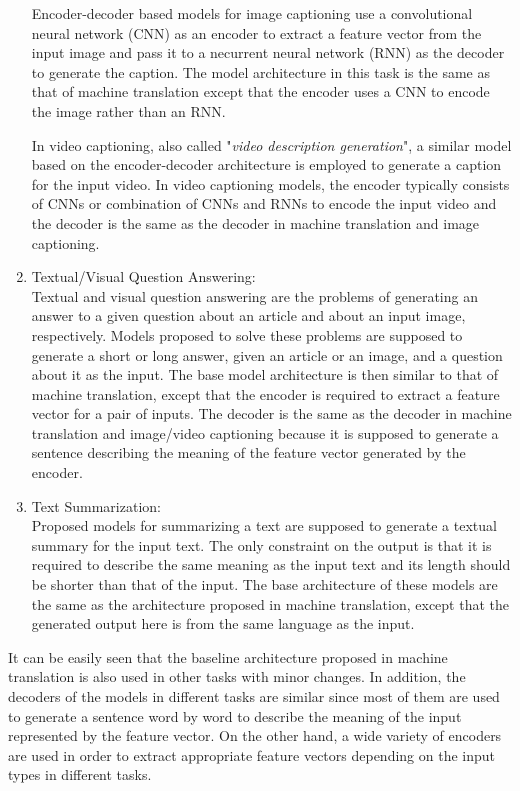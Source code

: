 \documentclass[preprint, 10pt]{elsarticle}
\begin{document}
\begin{enumerate}
		Encoder-decoder based models for image captioning use a convolutional neural network (CNN) as an encoder to extract a feature vector from the input image and pass it to a necurrent neural network (RNN) as the decoder to generate the caption. The model architecture in this task is the same as that of machine translation except that the encoder uses a CNN to encode the image rather than an RNN.
		
		In video captioning, also called "\textit{video description generation}", a similar model based on the encoder-decoder architecture is employed to generate a caption for the input video. In video captioning models, the encoder typically consists of CNNs or combination of CNNs and RNNs to encode the input video and the decoder is the same as the decoder in machine translation and image captioning. 
		
		
		\item Textual/Visual Question Answering:\\
		Textual and visual question answering are the problems of generating an answer to a given question about an article and about an input image, respectively. Models proposed to solve these problems are supposed to generate a short or long answer, given an article or an image, and a question about it as the input. The base model architecture is then similar to that of machine translation, except that the encoder is required to extract a feature vector for a pair of inputs. The decoder is the same as the decoder in machine translation and image/video captioning because it is supposed to generate a sentence describing the meaning of the feature vector generated by the encoder.
		
		\item Text Summarization:\\
		Proposed models for summarizing a text are supposed to generate a textual summary for the input text. The only constraint on the output is that it is required to describe the same meaning as the input text and its length should be shorter than that of the input. The base architecture of these models are the same as the architecture proposed in machine translation, except that the generated output here is from the same language as the input. 
		
	\end{enumerate}
	
	It can be easily seen that the baseline architecture proposed in machine translation is also used in other tasks with minor changes. In addition, the decoders of the models in different tasks are similar since most of them are used to generate a sentence word by word to describe the meaning of the input represented by the feature  vector. On the other hand, a wide variety of encoders are used in order to extract appropriate feature vectors depending on the input types in different tasks. 
	
\end{document}
